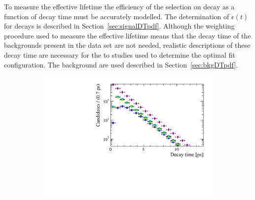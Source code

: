 To measure the \bsmumu effective lifetime the efficiency of the selection on \bsmumu decay as a function of decay time must be accurately modelled. The determination of $\epsilon(t)$ for \bsmumu decays is described in Section~\ref{sec:signalDTpdf}. Although the weighting procedure used to measure the \bsmumu effective lifetime means that the decay time \pdfs of the backgrounds present in the data set are not needed, realistic  descriptions of these decay time \pdfs are necessary for the to studies used to determine the optimal fit configuration. The background \pdfs are used described in Section~\ref{sec:bkgDTpdf}.

\begin{figure}[htbp]
    \centering
   \begin{subfigure}[b]{0.48\textwidth}
        \includegraphics[width= \textwidth]{./Figs/LifetimeMeasurement/DT.pdf}
    \end{subfigure}
   ~ %
    \begin{subfigure}[b]{0.48\textwidth}

\end{subfigure}
\end{figure}
